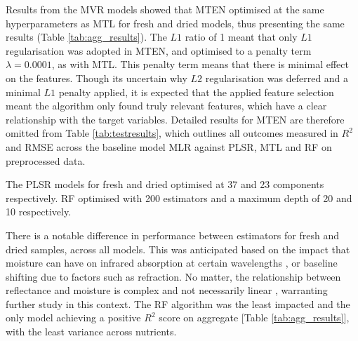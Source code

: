 \documentclass[conference]{IEEEtran}
\begin{document}

Results from the MVR models showed that MTEN optimised at the same hyperparameters as MTL for fresh and dried models, thus presenting the same results (Table \ref{tab:agg_results}). The $L1$ ratio of 1 meant that only $L1$ regularisation was adopted in MTEN, and optimised to a penalty term $\lambda=0.0001$, as with MTL. This penalty term means that there is minimal effect on the features. Though its uncertain why $L2$ regularisation was deferred and a minimal $L1$ penalty applied, it is expected that the applied feature selection meant the algorithm only found truly relevant features, which have a clear relationship with the target variables. Detailed results for MTEN are therefore omitted from Table \ref{tab:testresults}, which outlines all outcomes measured in $R^2$ and RMSE across the baseline model MLR against PLSR, MTL and RF on preprocessed data.

The PLSR models for fresh and dried optimised at 37 and 23 components respectively. RF optimised with 200 estimators and a maximum depth of 20 and 10 respectively.

There is a notable difference in performance between estimators for fresh and dried samples, across all models. This was anticipated based on the impact that moisture can have on infrared absorption at certain wavelengths \cite{Chon2021}, or baseline shifting due to factors such as refraction. No matter, the relationship between reflectance and moisture is complex and not necessarily linear \cite{Weidong2002}, warranting further study in this context. The RF algorithm was the least impacted and the only model achieving a positive $R^2$ score on aggregate [Table \ref{tab:agg_results}], with the least variance across nutrients. 
\end{document}
